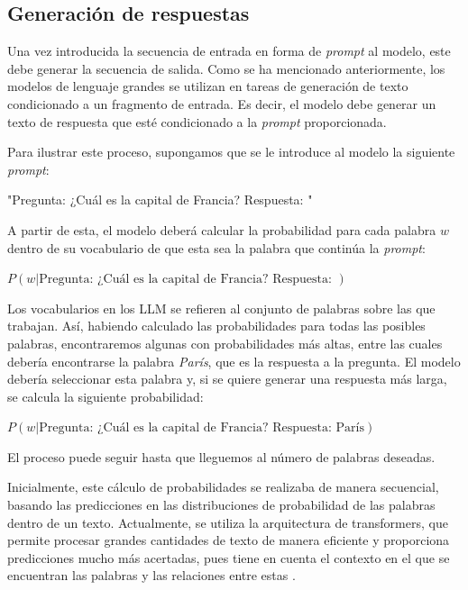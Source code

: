 \documentclass[11pt,spanish,listoffigures,listoftables]{tfgetsinf}
\begin{document}
\subsection{Generación de respuestas}

Una vez introducida la secuencia de entrada en forma de \textit{prompt} al modelo, este debe generar la secuencia de salida. Como se ha mencionado anteriormente, los modelos de lenguaje grandes se utilizan en tareas de generación de texto condicionado a un fragmento de entrada. Es decir, el modelo debe generar un texto de respuesta que esté condicionado a la \textit{prompt} proporcionada.

Para ilustrar este proceso, supongamos que se le introduce al modelo la siguiente \textit{prompt}:

\begin{displayquote}
\centerline{"Pregunta: ¿Cuál es la capital de Francia? Respuesta: "}
\end{displayquote}

A partir de esta, el modelo deberá calcular la probabilidad para cada palabra $w$ dentro de su vocabulario de que esta sea la palabra que continúa la \textit{prompt}:

\begin{displayquote}
\centerline{$P(w|\text{Pregunta: ¿Cuál es la capital de Francia? Respuesta: })$}
\end{displayquote}

Los vocabularios en los LLM se refieren al conjunto de palabras sobre las que trabajan. Así, habiendo calculado las probabilidades para todas las posibles palabras, encontraremos algunas con probabilidades más altas, entre las cuales debería encontrarse la palabra \textit{París}, que es la respuesta a la pregunta. El modelo debería seleccionar esta palabra y, si se quiere generar una respuesta más larga, se calcula la siguiente probabilidad:

\begin{displayquote}
\centerline{$P(w|\text{Pregunta: ¿Cuál es la capital de Francia? Respuesta: París})$}
\end{displayquote}

El proceso puede seguir hasta que lleguemos al número de palabras deseadas.

Inicialmente, este cálculo de probabilidades se realizaba de manera secuencial, basando las predicciones en las distribuciones de probabilidad de las palabras dentro de un texto. Actualmente, se utiliza la arquitectura de transformers, que permite procesar grandes cantidades de texto de manera eficiente y proporciona predicciones mucho más acertadas, pues tiene en cuenta el contexto en el que se encuentran las palabras y las relaciones entre estas \cite{burtsev2023working}.
\end{document}
